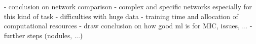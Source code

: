 
- conclusion on network comparison
- complex and specific networks especially for this kind of task
- difficulties with huge data
- training time and allocation of computational resources
- draw conclusion on how good ml is for MIC, issues, ...
- further steps (nodules, ...)